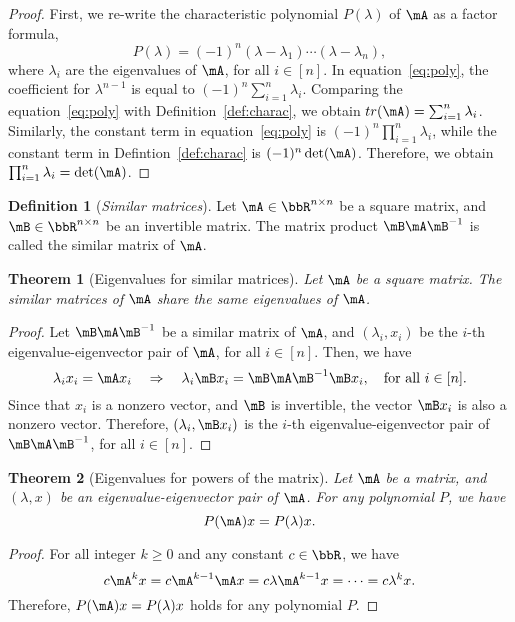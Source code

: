 \documentclass[11pt]{article}
\theoremstyle{plain}
\newtheorem{thm}{Theorem}[section]
\theoremstyle{definition}
\newtheorem{defn}{Definition}
\begin{document}
\begin{proof}
	First, we re-write the characteristic polynomial $P(\lambda)$ of $\mA$ as a factor formula,
	\begin{equation}\label{eq:poly}
		P(\lambda) = (-1)^n (\lambda - \lambda_1)\cdots (\lambda - \lambda_n), 
	\end{equation}   
	where $\lambda_i$ are the eigenvalues of $\mA$, for all $ i \in [n]$. In equation~\eqref{eq:poly}, the coefficient for $\lambda^{n-1}$ is equal to $(-1)^n\sum_{i=1}^n \lambda_i$. Comparing the equation~\eqref{eq:poly} with Definition~\ref{def:charac}, we obtain $tr(\mA) = \sum_{i=1}^n \lambda_i$. Similarly, the constant term in equation~\eqref{eq:poly} is $(-1)^n \prod_{i=1}^n \lambda_i $, while the constant term in Defintion~\ref{def:charac} is $(-1)^n \det(\mA)$.  Therefore, we obtain $\prod_{i=1}^n \lambda_i = \det(\mA)$.
\end{proof}

\begin{defn}[\textit{Similar matrices}]\label{def:similar}
	Let $\mA \in \bbR^{n \times n}$ be a square matrix, and $\mB \in \bbR^{n \times n}$ be an invertible matrix. The matrix product $\mB \mA \mB^{-1}$ is called the similar matrix of $\mA$.
\end{defn}

\begin{thm}[Eigenvalues for similar matrices]\label{thm:similar}
	Let $\mA$ be a square matrix. The similar matrices of $\mA$ share the same eigenvalues of $\mA$.
\end{thm}
\begin{proof}
	Let $\mB \mA \mB^{-1}$ be a similar matrix of $\mA$, and $(\lambda_i, x_i)$ be the $i$-th eigenvalue-eigenvector pair of $\mA$, for all $i \in [n]$. Then, we have
	\[ \lambda_i x_i = \mA x_i \quad \Rightarrow \quad \lambda_i \mB x_i = \mB \mA \mB^{-1} \mB x_i, \quad \text{for all }i \in [n]. \]
	Since that $x_i$ is a nonzero vector, and $\mB$ is invertible, the vector $\mB x_i$ is also a nonzero vector. Therefore, $(\lambda_i, \mB x_i)$ is the $i$-th eigenvalue-eigenvector pair of $\mB \mA \mB^{-1}$, for all $i \in [n]$.
\end{proof}

\begin{thm}[Eigenvalues for powers of the matrix]
	Let $\mA$ be a matrix, and $(\lambda,x)$  be an eigenvalue-eigenvector pair of $\mA$. For any polynomial $P$, we have
	\[ P(\mA) x = P(\lambda) x. \]
\end{thm}
\begin{proof}
	For all integer $k \geq 0$ and any constant $c \in \bbR$, we have
	\[ c\mA^k x = c\mA^{k-1} \mA x= c\lambda \mA^{k-1} x = \cdots = c\lambda^k x.\]
	Therefore, $P(\mA)x = P(\lambda)x$ holds for any polynomial $P$.
\end{proof}
\end{document}
